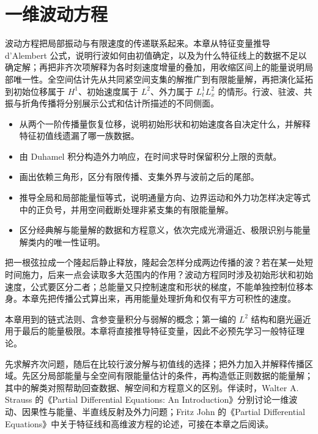 \chapter{一维波动方程}
\label{b2:ch:09}
\begin{chapterabstract}
波动方程把局部振动与有限速度的传递联系起来。本章从特征变量推导 d'Alembert 公式，说明行波如何由初值确定，以及为什么特征线上的数据不足以确定解；再把非齐次项解释为各时刻速度增量的叠加，用收缩区间上的能量说明局部唯一性。全空间估计先从共同紧空间支集的解推广到有限能量解，再把演化延拓到初始位移属于 \(H^1\)、初始速度属于 \(L^2\)、外力属于 \(L^1_tL^2_x\) 的情形。行波、驻波、共振与折角传播将分别展示公式和估计所描述的不同侧面。
\end{chapterabstract}
\begin{learninggoals}
\begin{itemize}
\item\label{b2:item:09-goal-characteristic}从两个一阶传播量恢复位移，说明初始形状和初始速度各自决定什么，并解释特征初值线遗漏了哪一族数据。
\item\label{b2:item:09-goal-forcing}由 Duhamel 积分构造外力响应，在时间求导时保留积分上限的贡献。
\item\label{b2:item:09-goal-cone}画出依赖三角形，区分有限传播、支集外界与波前之后的尾部。
\item\label{b2:item:09-goal-energy}推导全局和局部能量恒等式，说明通量方向、边界运动和外力功怎样决定等式中的正负号，并用空间截断处理非紧支集的有限能量解。
\item\label{b2:item:09-goal-limit}区分经典解与能量解的数据和方程意义，依次完成光滑逼近、极限识别与能量解类内的唯一性证明。
\end{itemize}
\end{learninggoals}

把一根弦拉成一个隆起后静止释放，隆起会怎样分成两边传播的波？若在某一处短时间施力，后来一点会读取多大范围内的作用？波动方程同时涉及初始形状和初始速度，公式要区分二者；总能量又只控制速度和形状的梯度，不能单独控制位移本身。本章先把传播公式算出来，再用能量处理折角和仅有平方可积性的速度。

\ProseParagraphBreak

本章用到的链式法则、含参变量积分与弱解的概念；第一编的 \(L^2\) 结构和磨光逼近用于最后的能量极限。本章将直接推导特征变量，因此不必预先学习一般特征理论。

\ProseParagraphBreak

先求解齐次问题，随后在比较行波分解与初值线的选择；把外力加入并解释传播区域。先区分局部能量与全空间有限能量估计的条件，再构造低正则数据的能量解；其中的解类对照帮助回查数据、解空间和方程意义的区别。伴读时，Walter A. Strauss 的《Partial Differential Equations: An Introduction》\cite[Sections 2.1--2.2, 3.2, 3.4]{Strauss2008Partial}分别讨论一维波动、因果性与能量、半直线反射及外力问题；Fritz John 的《Partial Differential Equations》\cite{John1991Partial}中关于特征线和高维波方程的论述，可接在本章之后阅读。

